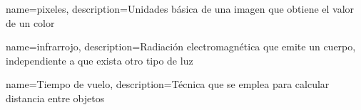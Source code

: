 
 {
 name={pixeles},
 description={Unidades b\'asica de una imagen que obtiene el valor de un color}
 }
 
 {
 name={infrarrojo},
 description={Radiaci\'on electromagn\'etica que emite un cuerpo, independiente a que exista otro tipo de luz}
 }
 
 {
 name={Tiempo de vuelo},
 description={Técnica que se emplea para calcular distancia entre objetos}
 }